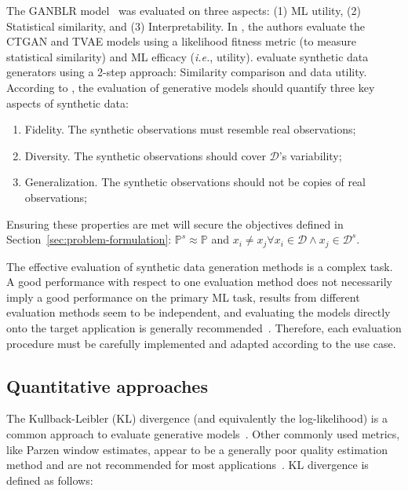 \documentclass[parskip=full]{scrartcl}
\begin{document}
The GANBLR model~\cite{zhang2021ganblr} was evaluated on three aspects: (1) ML
utility, (2) Statistical similarity, and (3) Interpretability. In
\citet{xu2019modeling}, the authors evaluate the CTGAN and TVAE models using a
likelihood fitness metric (to measure statistical similarity) and ML efficacy
(\textit{i.e.}, utility). \citet{hittmeir2019utility} evaluate synthetic data
generators using a 2-step approach: Similarity comparison and data utility.
According to \citet{alaa2022faithful}, the evaluation of generative models
should quantify three key aspects of synthetic data:

\begin{enumerate}

    \item Fidelity. The synthetic observations must resemble real
        observations; 

    \item Diversity. The synthetic observations should cover $\mathcal{D}$'s
        variability;

    \item Generalization. The synthetic observations should not be copies of
        real observations;

\end{enumerate}

Ensuring these properties are met will secure the objectives defined in
Section~\ref{sec:problem-formulation}: $\mathbb{P}^s \approx
\mathbb{P}$ and $x_i \neq x_j \forall x_i \in \mathcal{D} \wedge x_j \in
\mathcal{D}^s$.

The effective evaluation of synthetic data generation methods is a complex
task. A good performance with respect to one evaluation method does not
necessarily imply a good performance on the primary ML task, results from
different evaluation methods seem to be independent, and evaluating the models
directly onto the target application is generally
recommended~\cite{theis2016note}. Therefore, each evaluation procedure must be
carefully implemented and adapted according to the use case.

\subsection{Quantitative approaches}

The Kullback-Leibler (KL) divergence (and equivalently the log-likelihood) is a
common approach to evaluate generative models~\cite{theis2016note}. Other
commonly used metrics, like Parzen window estimates, appear to be a generally
poor quality estimation method and are not recommended for most
applications~\cite{theis2016note}. KL divergence is defined as follows:
\end{document}
